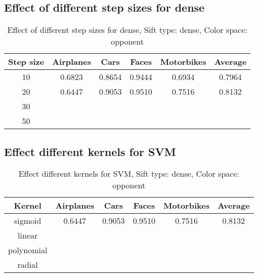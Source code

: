 \subsection{Effect of different step sizes for dense}

\begin{table}[H]
\begin{tabular}{|c|ccccc|}
\hline
\textbf{Step size} & \textbf{Airplanes} & \textbf{Cars} & \textbf{Faces} & \textbf{Motorbikes} & \textbf{Average}\\
\hline
10 & 0.6823 & 0.8654 & 0.9444 & 0.6934 & 0.7964\\
20 & 0.6447 & 0.9053 & 0.9510 & 0.7516 & 0.8132\\
30 & & & & & \\
50 & & & & & \\
\hline
\end{tabular}
\caption{Effect of different step sizes for dense, Sift type: dense, Color space: opponent}
\end{table}


\subsection{Effect different kernels for SVM}

\begin{table}[H]
\begin{tabular}{|c|ccccc|}
\hline
\textbf{Kernel} & \textbf{Airplanes} & \textbf{Cars} & \textbf{Faces} & \textbf{Motorbikes} & \textbf{Average}\\
\hline
sigmoid & 0.6447 & 0.9053 & 0.9510 & 0.7516 & 0.8132\\
linear & & & & & \\
polynomial & & & & & \\
radial & & & & & \\
\hline
\end{tabular}
\caption{Effect different kernels for SVM, Sift type: dense, Color space: opponent}
\end{table}
